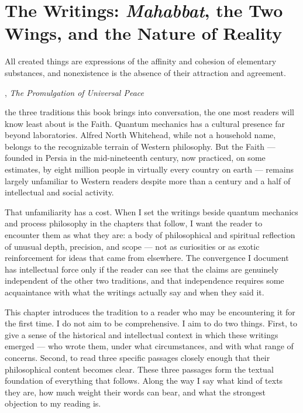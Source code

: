 \chapter[The Writings: \textit{Mahabbat} and the Two Wings]{The Writings: \textit{Mahabbat}, the Two Wings, and the Nature of Reality}
\label{ch:writings-mahabbat}

\epigraph{All created things are expressions of the affinity and cohesion of
  elementary substances, and nonexistence is the absence of their attraction
  and agreement.}{\AbdulBaha, \textit{The Promulgation of Universal Peace}}


 the three traditions this book brings into conversation, the one most
readers will know least about is the \bahai Faith.
Quantum mechanics has a cultural presence far beyond laboratories.
Alfred North Whitehead, while not a household name, belongs to the
recognizable terrain of Western philosophy.
But the \bahai Faith --- founded in Persia in the mid-nineteenth century, now
practiced, on some estimates, by eight million people in virtually every
country on earth --- remains largely unfamiliar to Western readers despite more than a century and
a half of intellectual and social activity.

That unfamiliarity has a cost.
When I set the \bahai writings beside quantum mechanics and process philosophy
in the chapters that follow, I want the reader to encounter them as
what they are: a body of philosophical and spiritual reflection of unusual
depth, precision, and scope --- not as curiosities or as exotic reinforcement
for ideas that came from elsewhere.
The convergence I document has intellectual force only if the reader
can see that the \bahai claims are genuinely independent of the other two
traditions, and that independence requires some acquaintance with what
the writings actually say and when they said it.

This chapter introduces the \bahai tradition to a reader who may be
encountering it for the first time.
I do not aim to be comprehensive.
I aim to do two things.
First, to give a sense of the historical and intellectual context in which
these writings emerged --- who wrote them, under what circumstances, and
with what range of concerns.
Second, to read three specific passages closely enough that their
philosophical content becomes clear.
These three passages form the textual foundation of everything that follows.
Along the way I say what kind of texts they are, how much weight their words
can bear, and what the strongest objection to my reading is.

